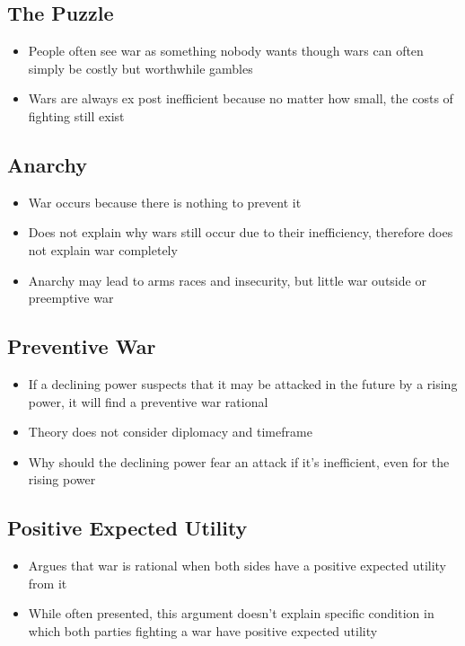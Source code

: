 \documentclass[11pt]{article}
\begin{document}
\subsection{The Puzzle}
\label{sec:org3fe3842}
\begin{itemize}
\item People often see war as something nobody wants though wars can often simply be costly but worthwhile gambles
\item Wars are always ex post inefficient because no matter how small, the costs of fighting still exist
\end{itemize}
\subsection{Anarchy}
\label{sec:orgfbbd3ec}
\begin{itemize}
\item War occurs because there is nothing to prevent it
\item Does not explain why wars still occur due to their inefficiency, therefore does not explain war completely
\item Anarchy may lead to arms races and insecurity, but little war outside or preemptive war
\end{itemize}
\subsection{Preventive War}
\label{sec:org90ed1ce}
\begin{itemize}
\item If a declining power suspects that it may be attacked in the future by a rising power, it will find a preventive war rational
\item Theory does not consider diplomacy and timeframe
\item Why should the declining power fear an attack if it's inefficient, even for the rising power
\end{itemize}
\subsection{Positive Expected Utility}
\label{sec:org77e8214}
\begin{itemize}
\item Argues that war is rational when both sides have a positive expected utility from it
\item While often presented, this argument doesn't explain specific condition in which both parties fighting a war have positive expected utility
\end{itemize}
\end{document}
